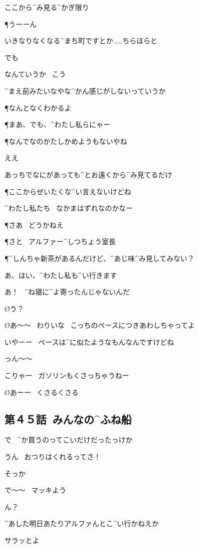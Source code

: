 \AM ここから^{み}{見}る^{かぎ}{限}り

\P うーーん

\page
\AM いきなりなくなる^{まち}{町}ですとか……ちらほらと

\AM でも

\AM なんていうか
\ こう

\AM ^{まえ}{前}みたいなやな^{かん}{感}じがしないっていうか

\P なんとなくわかるよ

\page
\P まあ、でも、^{わたし}{私}らにゃー

\P なんでなのかたしかめようもないやね

\AM ええ

\AM あっちでなにがあっても^{とお}{遠}くから^{み}{見}てるだけ

\P ここからぜいたくな^{い}{言}えないけどね

\page[20]
\AM ^{わたし}{私}たち
\ なかまはずれなのかなー

\P さあ
\ どうかねえ

\page
\P さと
\ アルファー^{しつちょう}{室長}

\P ^{しんちゃ}{新茶}があるんだけど、^{あじ}{味}^{み}{見}してみない？

\AM あ、はい、^{わたし}{私}も^{い}{行}きます

\page[23]
\A あ！
\ ^{ね}{寝}に^{よ}{寄}ったんじゃないんだ

\O う？

\O あ〜〜
\ わりいな
\ こっちのペースにつきあわしちゃってよ

\A いやーー
\ ペースは^{に}{似}たようなもんなんですけどね

\A っん〜〜

\page
\A こりゃー
\ ガソリンもくさっちゃうねー

\O あーー
\ くさるくさる


\subsection{第４５話\ みんなの^{ふね}{船}}

\page[26]
\T で
\ ^{か}{買}うのってこいだけだったっけか

\M うん
\ おつりはくれるってさ！

\page
\T そっか

\T で〜〜
\ マッキよう

\M ん？

\T ^{あした}{明日}あたりアルファんとこ^{い}{行}かねえか

\T サラッとよ


